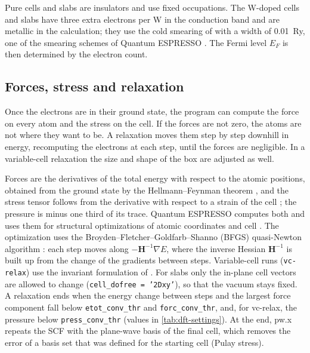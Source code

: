 Pure \InO{} cells and slabs are insulators and use fixed occupations. The W-doped cells and slabs have three extra
electrons per W in the conduction band and are metallic in the calculation; they use the cold smearing of
\citet{Marzari1999} with a width of 0.01~Ry, one of the smearing schemes of Quantum ESPRESSO \citep[p.~7]{Giannozzi2009}.
The Fermi level $E_F$ is then determined by the electron count.

\subsection{Forces, stress and relaxation}
\label{sec:dft-relax}

\begin{dftplain}
Once the electrons are in their ground state, the program can compute the force on every atom and the stress on the
cell. If the forces are not zero, the atoms are not where they want to be. A relaxation moves them step by step
downhill in energy, recomputing the electrons at each step, until the forces are negligible. In a variable-cell
relaxation the size and shape of the box are adjusted as well.
\end{dftplain}

Forces are the derivatives of the total energy with respect to the atomic positions, obtained from the ground state by
the Hellmann--Feynman theorem \citep{Feynman1939}, and the stress tensor follows from the derivative with respect to a
strain of the cell \citep{Nielsen1985}; the pressure is minus one third of its trace. Quantum ESPRESSO computes both
and uses them for structural optimizations of atomic coordinates and cell \citep[p.~5]{Giannozzi2009}. The
optimization uses the Broyden--Fletcher--Goldfarb--Shanno (BFGS) quasi-Newton algorithm
\citep[p.~7]{Giannozzi2009}: each step moves along $-\mathbf{H}^{-1}\nabla E$, where the inverse
Hessian $\mathbf{H}^{-1}$ is built up from the change of the gradients between steps. Variable-cell runs (\texttt{vc-relax})
use the invariant formulation of \citet{Wentzcovitch1991}. For slabs only the in-plane cell vectors are allowed to change
(\texttt{cell\_dofree = '2Dxy'}), so that the vacuum stays fixed. A relaxation ends when the energy change between steps
and the largest force component fall below \texttt{etot\_conv\_thr} and \texttt{forc\_conv\_thr}, and, for vc-relax,
the pressure below \texttt{press\_conv\_thr} (values in \cref{tab:dft-settings}). At the end, pw.x repeats the SCF with
the plane-wave basis of the final cell, which removes the error of a basis set that was defined for the starting cell
(Pulay stress).

